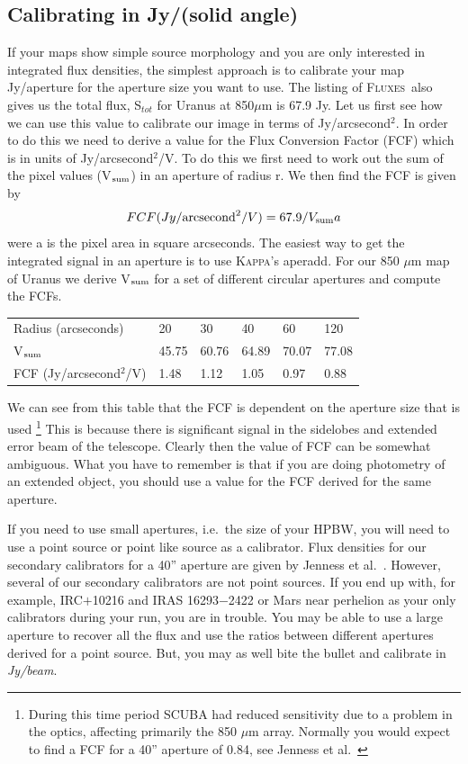 \documentclass[twoside,11pt]{article}
\newcommand{\Kappa}{\xref{\textsc{Kappa}}{sun95}{}}
\newcommand{\fluxes}{\xref{\textsc{Fluxes}}{sun213}{}}
\newcommand{\task}[1]{\textsf{#1}}
\newcommand{\aperadd}{\xref{\task{aperadd}}{sun95}{APERADD}}
\newcommand{\xref}[3]{#1}
\newcommand{\xlabel}[1]{}
\renewcommand{\_}{\texttt{\symbol{95}}}
\begin{document}
\subsection{\xlabel{calibration_Jy/aperture} Calibrating in Jy/(solid 
angle)\label{Calibration_aperture}}

If your maps show simple source morphology and you are only interested
in integrated flux densities, the simplest approach is to calibrate
your map Jy/aperture for the aperture size you want to use.  The
listing of \fluxes\ also gives us the total flux, S$_{tot}$ for Uranus
at 850$\mu$m is 67.9 Jy.  Let us first see how we can use this value
to calibrate our image in terms of Jy/arcsecond$^2$.  In order to do
this we need to derive a value for the Flux Conversion Factor (FCF)
which is in units of Jy/arcsecond$^2$/V. To do this we first need to
work out the sum of the pixel values (V$_{\rm sum}$) in an aperture of
radius r.  We then find the FCF is given by \begin{equation}
FCF(Jy/{\rm arcsecond}^2/V)=67.9/V_{\rm sum}a \end{equation} were a is
the pixel area in square arcseconds.  The easiest way to get the
integrated signal in an aperture is to use \Kappa's \aperadd.  For our
850 $\mu$m map of Uranus we derive V$_{\rm sum}$ for a set of
different circular apertures and compute the FCFs.


\begin{tabular}[c]{llllll}
Radius (arcseconds) & 20 & 30 & 40 & 60 & 120 \\
V$_{\rm sum}$ & 45.75 & 60.76 & 64.89 & 70.07 & 77.08 \\
FCF (Jy/arcsecond$^2$/V) & 1.48 & 1.12 & 1.05 & 0.97 & 0.88 \\
\end{tabular} 

We can see from this table that the FCF is dependent on the aperture
size that is used \footnote{During this time period SCUBA had reduced
sensitivity due to a problem in the optics, affecting primarily the
850 $\mu$m array.  Normally you would expect to find a FCF for a 40''
aperture of 0.84, see Jenness et al.\  \cite{Jenness01}} This is
because there is significant signal in the sidelobes and extended
error beam of the telescope.  Clearly then the value of FCF can be
somewhat ambiguous.  What you have to remember is that if you are
doing photometry of an extended object, you should use a value for the
FCF derived for the same aperture.

If you need to use small apertures, i.e.\ the size of your HPBW, you will need
to use a point source or point like source as a calibrator.  Flux densities
for our secondary calibrators for a 40'' aperture are given by Jenness et al.\ 
\cite{Jenness01}.  However, several of our secondary calibrators are not point
sources.  If you end up with, for example, IRC$+$10216 and IRAS 16293$-$2422
or Mars near perhelion as your only calibrators during your run, you are in
trouble.  You may be able to use a large aperture to recover all the flux and
use the ratios between different apertures derived for a point source.  But,
you may as well bite the bullet and calibrate in {\it Jy/beam}.
\end{document}
